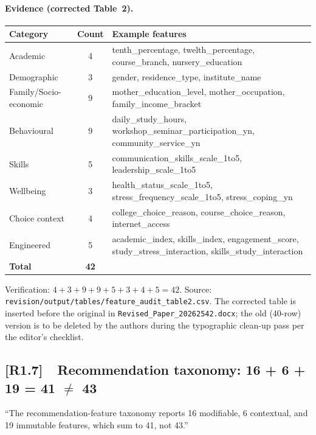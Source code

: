 \documentclass[11pt,a4paper]{article}
\newcommand{\cid}[1]{\textcolor{revred}{\textbf{[#1]}}}
\newcommand{\filebox}[1]{\texttt{\small #1}}
\newcommand{\stress}[1]{\textbf{#1}}
\begin{document}
\begin{itemize}
\paragraph{Evidence (corrected Table~2).}

\begin{center}\small
\begin{tabular}{l c p{6.4cm}}
\toprule
\textbf{Category} & \textbf{Count} & \textbf{Example features} \\
\midrule
Academic              & 4 & tenth\_percentage, twelth\_percentage, course\_branch, nursery\_education \\
Demographic           & 3 & gender, residence\_type, institute\_name \\
Family/Socio-economic & 9 & mother\_education\_level, mother\_occupation, family\_income\_bracket \\
Behavioural           & 9 & daily\_study\_hours, workshop\_seminar\_participation\_yn, community\_service\_yn \\
Skills                & 5 & communication\_skills\_scale\_1to5, leadership\_scale\_1to5 \\
Wellbeing             & 3 & health\_status\_scale\_1to5, stress\_frequency\_scale\_1to5, stress\_coping\_yn \\
Choice context        & 4 & college\_choice\_reason, course\_choice\_reason, internet\_access \\
Engineered            & 5 & academic\_index, skills\_index, engagement\_score, study\_stress\_interaction, skills\_study\_interaction \\
\midrule
\stress{Total}        & \stress{42} & \\
\bottomrule
\end{tabular}
\end{center}

\noindent Verification: $4 + 3 + 9 + 9 + 5 + 3 + 4 + 5 = 42$. Source: \filebox{revision/output/tables/feature\_audit\_table2.csv}. The corrected table is inserted before the original in \filebox{Revised\_Paper\_20262542.docx}; the old (40-row) version is to be deleted by the authors during the typographic clean-up pass per the editor's checklist.

\subsection*{\cid{R1.7}~~Recommendation taxonomy: 16 + 6 + 19 = 41 $\neq$ 43}

\begin{reviewerquote}
``The recommendation-feature taxonomy reports 16 modifiable, 6 contextual, and 19 immutable features, which sum to 41, not 43.''
\end{reviewerquote}


\end{itemize}
\end{document}
